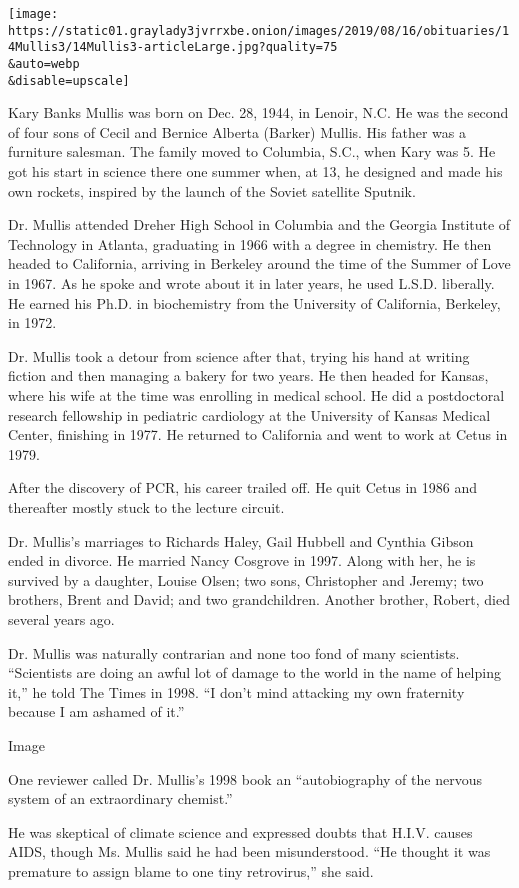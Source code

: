 \texttt{[image: https://static01.graylady3jvrrxbe.onion/images/2019/08/16/obituaries/14Mullis3/14Mullis3-articleLarge.jpg?quality=75\\\&auto=webp\\\&disable=upscale]}

Kary Banks Mullis was born on Dec. 28, 1944, in Lenoir, N.C. He was the
second of four sons of Cecil and Bernice Alberta (Barker) Mullis. His
father was a furniture salesman. The family moved to Columbia, S.C.,
when Kary was 5. He got his start in science there one summer when, at
13, he designed and made his own rockets, inspired by the launch of the
Soviet satellite Sputnik.

Dr. Mullis attended Dreher High School in Columbia and the Georgia
Institute of Technology in Atlanta, graduating in 1966 with a degree in
chemistry. He then headed to California, arriving in Berkeley around the
time of the Summer of Love in 1967. As he spoke and wrote about it in
later years, he used L.S.D. liberally. He earned his Ph.D. in
biochemistry from the University of California, Berkeley, in 1972.

Dr. Mullis took a detour from science after that, trying his hand at
writing fiction and then managing a bakery for two years. He then headed
for Kansas, where his wife at the time was enrolling in medical school.
He did a postdoctoral research fellowship in pediatric cardiology at the
University of Kansas Medical Center, finishing in 1977. He returned to
California and went to work at Cetus in 1979.

After the discovery of PCR, his career trailed off. He quit Cetus in
1986 and thereafter mostly stuck to the lecture circuit.

Dr. Mullis's marriages to Richards Haley, Gail Hubbell and Cynthia
Gibson ended in divorce. He married Nancy Cosgrove in 1997. Along with
her, he is survived by a daughter, Louise Olsen; two sons, Christopher
and Jeremy; two brothers, Brent and David; and two grandchildren.
Another brother, Robert, died several years ago.

Dr. Mullis was naturally contrarian and none too fond of many
scientists. ``Scientists are doing an awful lot of damage to the world
in the name of helping it,'' he told The Times in 1998. ``I don't mind
attacking my own fraternity because I am ashamed of it.''

Image

One reviewer called Dr. Mullis's 1998 book an ``autobiography of the
nervous system of an extraordinary chemist.''

He was skeptical of climate science and expressed doubts that H.I.V.
causes AIDS, though Ms. Mullis said he had been misunderstood. ``He
thought it was premature to assign blame to one tiny retrovirus,'' she
said.

